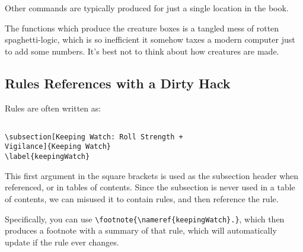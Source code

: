\documentclass[a4paper,openany]{book}
\begin{document}
\begin{multicols}{2}

Other commands are typically produced for just a single location in the book.

The functions which produce the creature boxes is a tangled mess of rotten spaghetti-logic, which is so inefficient it somehow taxes a modern computer just to add some numbers.
It's best not to think about how creatures are made.

\subsection{Rules References with a Dirty Hack}

Rules are often written as:

\begin{verbatim}

\subsection[Keeping Watch: Roll Strength +
Vigilance]{Keeping Watch}
\label{keepingWatch}

\end{verbatim}

This first argument in the square brackets is used as the subsection header when referenced, or in tables of contents.
Since the subsection is never used in a table of contents, we can misused it to contain rules, and then reference the rule.

Specifically, you can use \verb"\footnote{\nameref{keepingWatch}.}", which then produces a footnote with a summary of that rule, which will automatically update if the rule ever changes.

\end{multicols}
\end{document}
